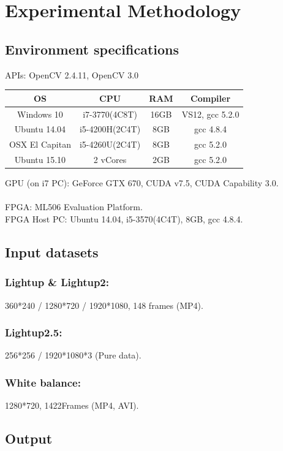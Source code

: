 \documentclass{acm_proc_article-sp}
\begin{document}
\section{Experimental Methodology}
\subsection{Environment specifications}
APIs: OpenCV 2.4.11, OpenCV 3.0 \\
\begin{table}[H]
\centering
\begin{tabular}{|c|c|c|c|} \hline
OS&CPU&RAM&Compiler\\ \hline
Windows 10 & i7-3770(4C8T) & 16GB & VS12, gcc 5.2.0 \\ \hline
Ubuntu 14.04 & i5-4200H(2C4T) & 8GB & gcc 4.8.4 \\ \hline
OSX El Capitan & i5-4260U(2C4T) & 8GB & gcc 5.2.0\\ \hline
Ubuntu 15.10 & 2 vCores & 2GB & gcc 5.2.0 \\ \hline
\end{tabular}
\end{table}
GPU (on i7 PC): GeForce GTX 670, CUDA v7.5, CUDA Capability 3.0. \\
\\
FPGA: ML506 Evaluation Platform. \\
FPGA Host PC: Ubuntu 14.04, i5-3570(4C4T), 8GB, gcc 4.8.4.
\subsection{Input datasets}
\subsubsection{Lightup \& Lightup2:}
 360*240 / 1280*720 / 1920*1080, 148 frames (MP4). \\
\subsubsection{Lightup2.5:}
 256*256 / 1920*1080*3 (Pure data). \\
\subsubsection{White balance:}
 1280*720, 1422Frames (MP4, AVI). \\

\subsection{Output}
\end{document}
